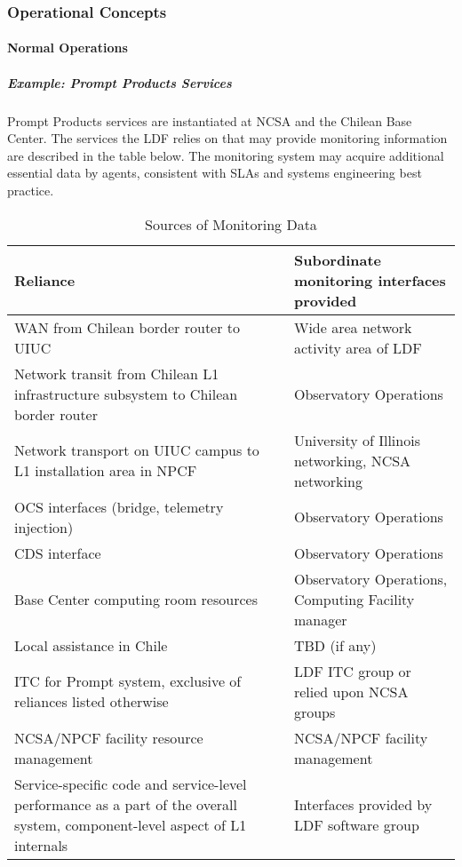 \subsubsection{Operational Concepts}

\paragraph{Normal Operations}

\subparagraph{Example: Prompt Products Services}

Prompt Products services are instantiated at NCSA and the Chilean Base Center. The
services the LDF relies on that may provide monitoring information are described
in the table below. The monitoring system may acquire additional essential data
by agents, consistent with SLAs and systems engineering best practice.

\begin{longtable}{|p{}|p{}|}
\caption{Sources of Monitoring Data} \\\hline
\textbf{Reliance} & \textbf{Subordinate monitoring interfaces provided} \\\hline
WAN from Chilean border router to UIUC & Wide area network activity area of LDF \\\hline
Network transit from Chilean L1 infrastructure subsystem to Chilean border router & Observatory Operations \\\hline
Network transport on UIUC campus to L1 installation area in NPCF & University of Illinois networking, NCSA networking \\\hline
OCS interfaces (bridge, telemetry injection) & Observatory Operations \\\hline
CDS interface & Observatory Operations \\\hline
Base Center computing room resources & Observatory Operations, Computing Facility manager \\\hline
Local assistance in Chile & TBD (if any) \\\hline
ITC for Prompt system, exclusive of reliances listed otherwise & LDF ITC group or relied upon NCSA groups \\\hline
NCSA/NPCF facility resource management & NCSA/NPCF facility management \\\hline
Service-specific code and service-level performance as a part of the overall system, component-level aspect of L1 internals & Interfaces provided by LDF software group \\\hline
\end{longtable}

